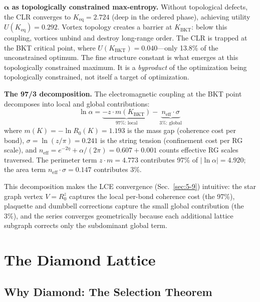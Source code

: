 \documentclass[aps,prd,onecolumn,superscriptaddress,floatfix,12pt]{revtex4-2}
\newcommand{\Rzero}{R_0}
\newcommand{\KBKT}{K_{\text{BKT}}}
\begin{document}
\textbf{$\bm{\alpha}$ as topologically constrained max-entropy.} Without topological defects, the CLR converges to $K_{\text{eq}} = 2.724$ (deep in the ordered phase), achieving utility $U(K_{\text{eq}}) = 0.292$. Vortex topology creates a barrier at $\KBKT$: below this coupling, vortices unbind and destroy long-range order. The CLR is trapped at the BKT critical point, where $U(\KBKT) = 0.040$---only 13.8\% of the unconstrained optimum. The fine structure constant is what emerges at this topologically constrained maximum. It is a \emph{byproduct} of the optimization being topologically constrained, not itself a target of optimization.

\textbf{The 97/3 decomposition.} The electromagnetic coupling at the BKT point decomposes into local and global contributions:
\begin{equation}\label{eq:97-3}
\boxed{\ln\alpha = \underbrace{-z \cdot m(\KBKT)}_{\text{97\%: local}} - \underbrace{n_{\text{eff}} \cdot \sigma}_{\text{3\%: global}}}
\end{equation}
where $m(K) = -\ln\Rzero(K) = 1.193$ is the mass gap (coherence cost per bond), $\sigma = \ln(z/\pi) = 0.241$ is the string tension (confinement cost per RG scale), and $n_{\text{eff}} = e^{-2\eta} + \alpha/(2\pi) = 0.607 + 0.001$ counts effective RG scales traversed. The perimeter term $z \cdot m = 4.773$ contributes 97\% of $|\ln\alpha| = 4.920$; the area term $n_{\text{eff}} \cdot \sigma = 0.147$ contributes 3\%.

This decomposition makes the LCE convergence (Sec.~\ref{sec:5-9}) intuitive: the star graph vertex $V = \Rzero^z$ captures the local per-bond coherence cost (the 97\%), plaquette and dumbbell corrections capture the small global contribution (the 3\%), and the series converges geometrically because each additional lattice subgraph corrects only the subdominant global term.

\section{The Diamond Lattice}\label{sec:3}

\subsection{Why Diamond: The Selection Theorem}\label{sec:3-1}
\end{document}
